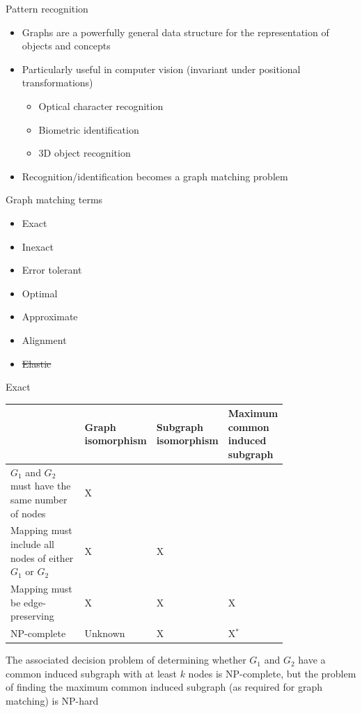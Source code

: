 \documentclass[xcolor=dvipsnames, 14pt]{beamer}
\begin{document}
\begin{frame}{Pattern recognition}
\begin{itemize}
\item Graphs are a powerfully general data structure for the representation of objects and concepts
\pause
\item Particularly useful in computer vision (invariant under positional transformations)
\pause
\begin{itemize}
\item Optical character recognition
\item Biometric identification
\item 3D object recognition
\end{itemize}
\pause
\item Recognition/identification becomes a graph matching problem
\end{itemize}
\end{frame}

\begin{frame}{Graph matching terms}
\begin{itemize}
\item Exact
\item Inexact
\item Error tolerant
\item Optimal
\item Approximate
\item Alignment
\item \sout{Elastic}
\end{itemize}
\end{frame}

\begin{frame}{Exact}
\centering
\scriptsize
\setlength\extrarowheight{3pt}\setlength{\tabcolsep}{3pt}
\begin{tabular}{|L{0.3\linewidth}|C{0.14\linewidth}|C{0.14\linewidth}|C{0.21\linewidth}|}
\hline
 & Graph isomorphism & Subgraph isomorphism & Maximum common induced subgraph \\ \hline\hline
$G_1$ and $G_2$ must have the same number of nodes & X & & \\ \hline
Mapping must include all nodes of either $G_1$ or $G_2$ & X & X & \\ \hline
Mapping must be edge-preserving & X & X & X\hspace{6pt} \\ \hline
NP-complete & Unknown & X & X$^*$ \\ \hline
\end{tabular}
\flushleft\tiny *The associated decision problem of determining whether $G_1$ and $G_2$ have a common induced subgraph with at least $k$ nodes is NP-complete, but the problem of finding the maximum common induced subgraph (as required for graph matching) is NP-hard
\end{frame}
\end{document}
